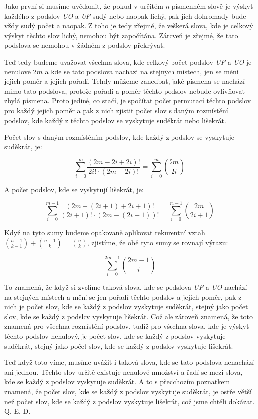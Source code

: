 \documentclass{fkssolpub}
\author{Ondřej Sedláček}
\begin{document}
Jako první si musíme uvědomit, že pokud v určitém $n$-písmenném slově je výskyt každého z podslov \textit{UO} a \textit{UF} sudý nebo naopak lichý, pak jich dohromady bude vždy sudý počet a naopak. Z toho je tedy zřejmé, že veškerá slova, kde je celkový výskyt těchto slov lichý, nemohou být započítána. Zároveň je zřejmé, že tato podslova se nemohou v žádném z podslov překrývat.

Teď tedy budeme uvažovat všechna slova, kde celkový počet podslov \textit{UF} a \textit{UO} je nenulové $2m$ a kde se tato podslova nachází na stejných místech, jen se mění jejich poměr a jejich pořadí. Tehdy můžeme zanedbat, jaké písmena se nachází mimo tato podslova, protože pořadí a poměr těchto podslov nebude ovlivňovat zbylá písmena. Proto jediné, co stačí, je spočítat počet permutací těchto podslov pro každý jejich poměr a pak z nich zjistit počet slov s daným rozmístění podslov, kde každý z těchto podslov se vyskytuje suděkrát nebo lišekrát.

Počet slov s daným rozmístěním podslov, kde každý z podslov se vyskytuje suděkrát, je:

\[
	\sum_{i = 0}^{m} \frac{(2m - 2i + 2i)!}{2i! \cdot (2m - 2i)!} = \sum_{i = 0}^{m} \binom{2m}{2i}
\]

A počet podslov, kde se vyskytují lišekrát, je:

\[
	\sum_{i = 0}^{m - 1} \frac{(2m - (2i + 1) + 2i + 1)!}{(2i + 1)! \cdot (2m - (2i + 1))!} = \sum_{i = 0}^{m - 1} \binom{2m}{2i + 1}
\]

Když na tyto sumy budeme opakovaně aplikovat rekurentní vztah $\binom{n - 1}{k - 1} + \binom{n - 1}{k} = \binom{n}{k}$, zjistíme, že obě tyto sumy se rovnají výrazu:

\[
	\sum_{i = 0}^{2m - 1} \binom{2m - 1}{i}
\]

To znamená, že když si zvolíme taková slova, kde se podslova \textit{UF} a \textit{UO} nachází na stejných místech a mění se jen pořadí těchto podslov a jejich poměr, pak z nich je počet slov, kde se každý z podslov vyskytuje suděkrát, stejný jako počet slov, kde se každý z podslov vyskytuje lišekrát. Což ale zároveň znamená, že toto znamená pro všechna rozmístění podslov, tudíž pro všechna slova, kde je výskyt těchto podslov nenulový, je počet slov, kde se každý z podslov vyskytuje suděkrát, stejný jako počet slov, kde se každý z podslov vyskytuje lišekrát.

Teď když toto víme, musíme uvážit i taková slova, kde se tato podslova nenachází ani jednou. Těchto slov určitě existuje nenulové množství a řadí se mezi slova, kde se každý z podslov vyskytuje suděkrát. A to s předchozím poznatkem znamená, že počet slov, kde se každý z podslov vyskytuje suděkrát, je ostře větší než počet slov, kde se každý z podslov vyskytuje lišekrát, což jsme chtěli dokázat. Q. E. D.
\end{document}
